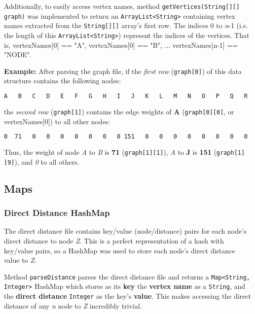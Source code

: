 Additionally, to easily access vertex names, method \texttt{getVertices(String[][] graph)} was implemented to return an \texttt{ArrayList<String>} containing vertex names extracted from the \texttt{String[][]} array's first row. The indices 0 to \emph{n}-1 (i.e. the length of this \texttt{ArrayList<String>}) represent the indices of the vertices. That is, vertexNames[0] == "A", vertexNames[0] == "B", ... vertexNames[n-1] == "NODE".

\vspace*{\baselineskip}
\textbf{Example:} After parsing the graph file, if the \emph{first row} (\texttt{graph[0]}) of this data structure contains the following nodes:
\begin{lstlisting}[language=Bash]
A   B   C   D   E   F   G   H   I   J   K   L   M   N   O   P   Q   R   S   T   Z
\end{lstlisting}
the \emph{second row} (\texttt{graph[1]}) contains the edge weights of \textbf{A} (\texttt{graph[0][0]}, or vertexNames[0]) to all other nodes:
\begin{lstlisting}[language=Bash]
0  71   0   0   0   0   0   0   0 151   0   0   0   0   0   0   0   0   0   0   0
\end{lstlisting}
Thus, the weight of node \emph{A} to \emph{B} is \textbf{71} (\texttt{graph[1][1]}), \emph{A} to \textbf{J} is \textbf{151} (\texttt{graph[1][9]}), and \emph{0} to all others.


\subsection*{Maps}

\hypertarget{hashmap}{\subsubsection*{Direct Distance HashMap}}
The direct distance file contains key/value (node/distance) pairs for each node's direct distance to node \emph{Z}. This is a perfect representation of a hash with key/value pairs, so a HashMap was used to store each node's direct distance value to \emph{Z}.

Method \texttt{parseDistance} parses the direct distance file and returns a \texttt{Map<String, Integer>} HashMap which stores as its \textbf{key} the \textbf{vertex name} as a \texttt{String}, and the \textbf{direct distance} \texttt{Integer} as the key's \textbf{value}. This makes accessing the direct distance of any \emph{n} node to \emph{Z} incredibly trivial.

